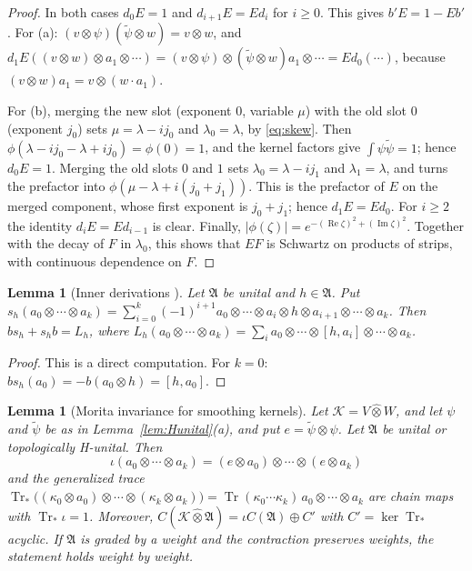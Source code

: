 \documentclass[11pt,oneside,reqno]{article}
\DeclareMathOperator{\Tr}{Tr}
\theoremstyle{plain}
\newtheorem{lemma}[theorem]{Lemma}
\theoremstyle{definition}
\theoremstyle{remark}
\begin{document}
\begin{proof}
In both cases \(d_0E=1\) and \(d_{i+1}E=Ed_i\) for \(i\geq0\). This gives
\(b'E=1-Eb'\). For (a):
\((v\otimes\psi)(\tilde\psi\otimes w)=v\otimes w\), and
\(d_1E((v\otimes w)\otimes a_1\otimes\cdots)=(v\otimes\psi)\otimes
(\tilde\psi\otimes w)a_1\otimes\cdots=Ed_0(\cdots)\), because
\((v\otimes w)a_1=v\otimes(w\cdot a_1)\).

For (b), merging the new slot (exponent \(0\), variable \(\mu\)) with the old
slot \(0\) (exponent \(j_0\)) sets \(\mu=\lambda-ij_0\) and
\(\lambda_0=\lambda\), by \eqref{eq:skew}. Then
\(\phi(\lambda-ij_0-\lambda+ij_0)=\phi(0)=1\), and the kernel factors give
\(\int\psi\tilde\psi=1\); hence \(d_0E=1\). Merging the old slots \(0\) and
\(1\) sets \(\lambda_0=\lambda-ij_1\) and \(\lambda_1=\lambda\), and turns
the prefactor into \(\phi(\mu-\lambda+i(j_0+j_1))\). This is the prefactor
of \(E\) on the merged component, whose first exponent is \(j_0+j_1\);
hence \(d_1E=Ed_0\). For \(i\geq2\) the identity \(d_iE=Ed_{i-1}\) is
clear. Finally,
\(|\phi(\zeta)|=e^{-(\operatorname{Re}\zeta)^2+(\operatorname{Im}\zeta)^2}\).
Together with the decay of \(F\) in \(\lambda_0\), this shows that \(EF\) is
Schwartz on products of strips, with continuous dependence on \(F\).
\end{proof}

\begin{lemma}[Inner derivations {\cite[1.3.3]{Loday}}]\label{lem:inner}
Let \(\mathfrak A\) be unital and \(h\in\mathfrak A\). Put
\(s_h(a_0\otimes\cdots\otimes a_k)=\sum_{i=0}^k(-1)^{i+1}a_0\otimes\cdots
\otimes a_i\otimes h\otimes a_{i+1}\otimes\cdots\otimes a_k\). Then
\(bs_h+s_hb=L_h\), where \(L_h(a_0\otimes\cdots\otimes a_k)=\sum_ia_0\otimes
\cdots\otimes[h,a_i]\otimes\cdots\otimes a_k\).
\end{lemma}

\begin{proof}
This is a direct computation. For \(k=0\):
\(bs_h(a_0)=-b(a_0\otimes h)=[h,a_0]\).
\end{proof}

\begin{lemma}[Morita invariance for smoothing kernels]\label{lem:morita}
Let \(\mathcal K=V\widehat\otimes W\), and let \(\psi\) and
\(\tilde\psi\) be as in Lemma~\ref{lem:Hunital}(a), and put \(e=\tilde\psi\otimes\psi\). Let
\(\mathfrak A\) be unital or topologically H-unital. Then
\[
 \iota(a_0\otimes\cdots\otimes a_k)=(e\otimes a_0)\otimes\cdots\otimes
 (e\otimes a_k)
\]
and the generalized trace
\(\Tr_*\bigl((\kappa_0\otimes a_0)\otimes\cdots\otimes(\kappa_k\otimes a_k)
\bigr)=\Tr(\kappa_0\cdots\kappa_k)\,a_0\otimes\cdots\otimes a_k\) are chain
maps with \(\Tr_*\iota=1\). Moreover, \(C(\mathcal K\widehat\otimes
\mathfrak A)=\iota C(\mathfrak A)\oplus C'\) with \(C'=\ker\Tr_*\) acyclic.
If \(\mathfrak A\) is graded by a weight and the contraction preserves
weights, the statement holds weight by weight.
\end{lemma}
\end{document}
